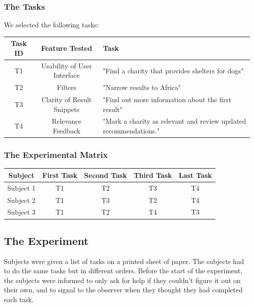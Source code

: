 \documentclass[unicode,9pt,a4paper,oneside,numbers=endperiod,openany]{scrartcl}
\begin{document}
\subsubsection{The Tasks}

We selected the following tasks:
\newline

\begin{tabular}{c|c|l}

    Task ID & Feature Tested              & Task                                                             \\ \hline
    T1      & Usability of User Interface & "Find a charity that provides shelters for dogs"                 \\
    T2      & Filters                     & "Narrow results to Africa"                                       \\
    T3      & Clarity of Result Snippets  & "Find out more information about the first result"               \\
    T4      & Relevance Feedback          & "Mark a charity as relevant and review updated recommendations." \\
\end{tabular}

\subsubsection{The Experimental Matrix}

\begin{tabular}{c|c|c|c|c}

    Subject   & First Task & Second Task & Third Task & Last Task \\ \hline
    Subject 1 & T1         & T2          & T3         & T4        \\
    Subject 2 & T1         & T3          & T2         & T4        \\
    Subject 3 & T1         & T2          & T4         & T3        \\
\end{tabular}

\subsection{The Experiment}

Subjects were given a list of tasks on a printed sheet of paper. The subjects had to do the same tasks but in different orders.
Before the start of the experiment, the subjects were informed to only ask for help if they couldn't figure it out on their own, and to signal to the observer when they thought they had completed each task.
\end{document}
